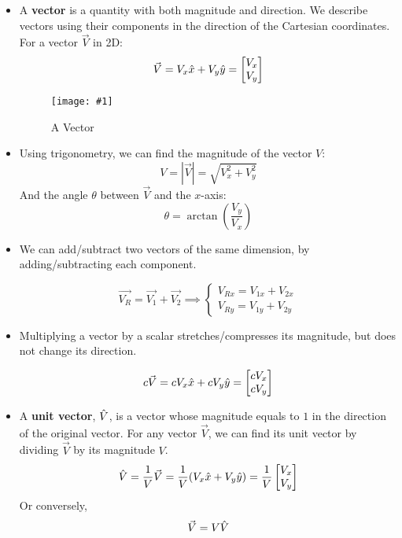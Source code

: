 \documentclass[11pt]{article}
\newcommand{\fig}[4]{
    \begin{figure}[H]
        \centering
        \texttt{[image: \#1]}
        \caption{#2}
        \label{exp4fit}
    \end{figure}
}
\theoremstyle{gangnamstyle}{\newtheorem{definition}{Definition}[]}
\theoremstyle{gangnamstyle}{\newtheorem{example}{Example}[]}
\theoremstyle{gangnamstyle}{\newtheorem{problem}{Problem}[]}
\begin{document}
\begin{itemize}
\item A \textbf{vector} is a quantity with both magnitude and direction. We describe vectors using their components in the direction of the Cartesian coordinates. For a vector $\Vec{V}$ in 2D: 
\[ \Vec{V} = V_x \Hat{x} + V_y \Hat{y} = 
\begin{bmatrix}
V_x \\
V_y
\end{bmatrix} \]
\fig{figs/0620/vec.png}{A Vector}{0.75}{0}

\item Using trigonometry, we can find the magnitude of the vector $V$:
\[ V = |\Vec{V}| = \sqrt{V_x^2 + V_y^2} \]
And the angle $\theta$ between $\Vec{V}$ and the $x$-axis:
\[ \theta = \arctan(\frac{V_y}{V_x}) \]

\pagebreak

\item We can add/subtract two vectors of the same dimension, by adding/subtracting each component. 

\[ \Vec{V_R} = \Vec{V_1} + \Vec{V_2} \implies 
\begin{cases}
V_{Rx} = V_{1x} + V_{2x} \\
V_{Ry} = V_{1y} + V_{2y}
\end{cases} \]

\item Multiplying a vector by a scalar stretches/compresses its magnitude, but does not change its direction. 

\[ c\Vec{V} = c V_x \Hat{x} + c V_y \Hat{y} = 
\begin{bmatrix}
c V_x \\
c V_y
\end{bmatrix} \]

\item A \textbf{unit vector}, $\Hat{V}$, is a vector whose magnitude equals to $1$ in the direction of the original vector. For any vector $\Vec{V}$, we can find its unit vector by dividing $\Vec{V}$ by its magnitude $V$. 
\[ \Hat{V} = \frac{1}{V} \Vec{V} = \frac{1}{V}(V_x \Hat{x} + V_y \Hat{y}) = \frac{1}{V}
\begin{bmatrix}
V_x \\
V_y
\end{bmatrix} \]
Or conversely, 
\[ \Vec{V} = V\Hat{V} \]


\end{itemize}
\end{document}
